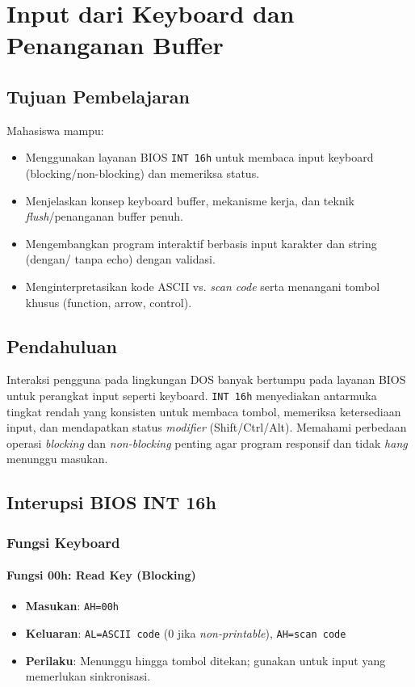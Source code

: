 \documentclass[../main.tex]{subfiles}
\begin{document}
\chapter{Input dari Keyboard dan Penanganan Buffer}

\section{Tujuan Pembelajaran}
Mahasiswa mampu:
\begin{itemize}
    \item Menggunakan layanan BIOS \texttt{INT 16h} untuk membaca input keyboard (blocking/non-blocking) dan memeriksa status.
    \item Menjelaskan konsep keyboard buffer, mekanisme kerja, dan teknik \textit{flush}/penanganan buffer penuh.
    \item Mengembangkan program interaktif berbasis input karakter dan string (dengan/ tanpa echo) dengan validasi.
    \item Menginterpretasikan kode ASCII vs. \textit{scan code} serta menangani tombol khusus (function, arrow, control).
\end{itemize}

\section{Pendahuluan}
Interaksi pengguna pada lingkungan DOS banyak bertumpu pada layanan BIOS untuk perangkat input seperti keyboard. \texttt{INT 16h} menyediakan antarmuka tingkat rendah yang konsisten untuk membaca tombol, memeriksa ketersediaan input, dan mendapatkan status \textit{modifier} (Shift/Ctrl/Alt). Memahami perbedaan operasi \textit{blocking} dan \textit{non-blocking} penting agar program responsif dan tidak \textit{hang} menunggu masukan.

\section{Interupsi BIOS INT 16h}
\subsection{Fungsi Keyboard}
\subsubsection{Fungsi 00h: Read Key (Blocking)}
\begin{itemize}
  \item \textbf{Masukan}: \texttt{AH=00h}
  \item \textbf{Keluaran}: \texttt{AL=ASCII code} (0 jika \textit{non-printable}), \texttt{AH=scan code}
  \item \textbf{Perilaku}: Menunggu hingga tombol ditekan; gunakan untuk input yang memerlukan sinkronisasi.
\end{itemize}
\end{document}
